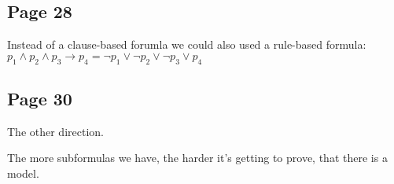 \documentclass[a4paper]{article}
\begin{document}
\subsection{Page 28}

Instead of a clause-based forumla we could also used a rule-based formula:
$p_1 \wedge p_2 \wedge p_3 \rightarrow p_4  = \neg p_1 \vee \neg p_2 \vee \neg
p_3 \vee p_4$

\subsection{Page 30}
The other direction.

The more subformulas we have, the harder it's getting to prove, that there is a
model.
\end{document}
